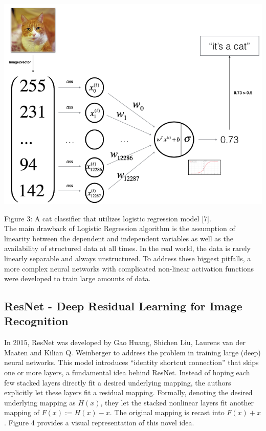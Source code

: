 \documentclass[conference]{IEEEtran}
\begin{document}
\begin{center}
    \includegraphics[scale=0.36]{LRNN.png}\\
\end{center}
Figure 3: A cat classifier that utilizes logistic regression model [7].\\

The main drawback of Logistic Regression algorithm is the assumption of linearity between the dependent and independent variables as well as the availability of structured data at all times. In the real world, the data is rarely linearly separable and always unstructured. To address these biggest pitfalls, a more complex neural networks with complicated non-linear activation functions were developed to train large amounts of data.

\subsection{\textbf{ResNet - Deep Residual Learning for Image Recognition}}
In 2015, ResNet was developed by Gao Huang, Shichen Liu, Laurens van der Maaten and Kilian Q. Weinberger to address the problem in training large (deep) neural networks. This model introduces “identity shortcut connection” that skips one or more layers, a fundamental idea behind ResNet. Instead of hoping each few stacked layers directly fit a
desired underlying mapping, the authors explicitly let these layers fit a residual mapping. Formally, denoting the desired
underlying mapping as $H(x)$, they let the stacked nonlinear layers fit another mapping of $F(x) := H(x)−x$. The original mapping is recast into $F(x)+x$. Figure 4 provides a visual representation of this novel idea.
\end{document}
